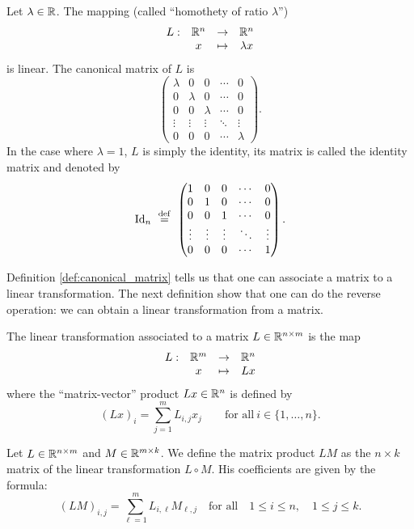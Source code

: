 \documentclass[11pt,nocut]{article}
\begin{document}
\begin{example}[Homothety]
	Let $\lambda \in \mathbb{R}$. The mapping (called ``homothety of ratio $\lambda$'')
	$$
	\begin{array}{cccc}
		L: & \mathbb{R}^n & \to & \mathbb{R}^n \\
		   & x & \mapsto & \lambda x
	\end{array}
	$$
	is linear. The canonical matrix of $L$ is 
	$$
	\begin{pmatrix}
		\lambda & 0 & 0 & \cdots & 0 \\
		0 & \lambda & 0 & \cdots & 0 \\
		0 & 0 &\lambda &  \cdots & 0 \\
		\vdots & \vdots& \vdots & \ddots & \vdots \\
		0 & 0 & 0 & \cdots & \lambda
	\end{pmatrix}
	.
	$$
	In the case where $\lambda = 1$, $L$ is simply the identity, its matrix is called the identity matrix and denoted by
	$${{\rm Id}}_n
	\ \overset{\rm def}{=} \
	\begin{pmatrix}
		1 & 0 & 0 & \cdots & 0 \\
		0 & 1 & 0 & \cdots & 0 \\
		0 & 0 &1 &  \cdots & 0 \\
		\vdots & \vdots& \vdots & \ddots & \vdots \\
		0 & 0 & 0 & \cdots & 1
	\end{pmatrix}.
	$$
\end{example}

Definition \ref{def:canonical_matrix} tells us that one can associate a matrix to a linear transformation. The next definition show that one can do the reverse operation: we can obtain a linear transformation from a matrix.

\begin{definition}
	The linear transformation associated to a matrix $L \in \mathbb{R}^{n \times m}$ is the map
	$$
	\begin{array}{cccc}
		L:& \mathbb{R}^m & \to & \mathbb{R}^n \\
		  & x & \mapsto & Lx
	\end{array}
	$$
	where the ``matrix-vector'' product $Lx \in \mathbb{R}^n$ is defined by
	$$
	(Lx)_i = \sum_{j=1}^m L_{i,j} x_j \qquad \text{for all} \ i \in \{1, \dots, n\}.
	$$
\end{definition}

\begin{definition}
	Let $L \in \mathbb{R}^{n \times m}$ and $M \in \mathbb{R}^{m \times k}$. 
	We define the matrix product $LM$ as the $n \times k$ matrix of the linear transformation $L \circ M$.
	His coefficients are given by the formula:
	$$
	(LM)_{i,j} = \sum_{\ell=1}^m L_{i,\ell} M_{\ell,j} \quad \text{for all} \quad 1 \leq i \leq n, \quad 1 \leq j \leq k.
	$$
\end{definition}
\end{document}

